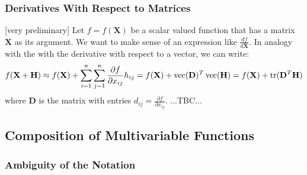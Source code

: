 
\subsubsection{Derivatives With Respect to Matrices}  [very preliminary]
Let $f = f(\mathbf{X})$ be a scalar valued function that has a matrix $\mathbf{X}$ as its argument. We want to make sense of an expression like $\frac{d f}{d \mathbf{X}}$. In analogy with the with the derivative with respect to a vector, we can write:
\begin{equation}
f(\mathbf{X + H}) \approx 
f(\mathbf{X}) + \sum_{i=1}^{n} \sum_{j=1}^{n} \frac{\partial f}{\partial x_{ij}} h_{ij} =
f(\mathbf{X}) + \operatorname{vec}(\mathbf{D})^T \operatorname{vec}(\mathbf{H}) =
f(\mathbf{X}) + \operatorname{tr}(\mathbf{D}^T \mathbf{H})
\end{equation}
where $\mathbf{D}$ is the matrix with entries $d_{ij} = \frac{\partial f}{\partial x_{ij}}$. ...TBC...





\subsection{Composition of Multivariable Functions}



\subsubsection{Ambiguity of the Notation}



